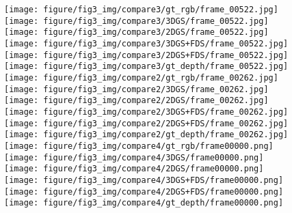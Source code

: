 \begin{figure}[t] \centering

    \texttt{[image: figure/fig3\_img/compare3/gt\_rgb/frame\_00522.jpg]}
    \texttt{[image: figure/fig3\_img/compare3/3DGS/frame\_00522.jpg]}
    \texttt{[image: figure/fig3\_img/compare3/2DGS/frame\_00522.jpg]}
    \texttt{[image: figure/fig3\_img/compare3/3DGS+FDS/frame\_00522.jpg]}
    \texttt{[image: figure/fig3\_img/compare3/2DGS+FDS/frame\_00522.jpg]}
    \texttt{[image: figure/fig3\_img/compare3/gt\_depth/frame\_00522.jpg]} \\


     \texttt{[image: figure/fig3\_img/compare2/gt\_rgb/frame\_00262.jpg]}
    \texttt{[image: figure/fig3\_img/compare2/3DGS/frame\_00262.jpg]}
    \texttt{[image: figure/fig3\_img/compare2/2DGS/frame\_00262.jpg]}
    \texttt{[image: figure/fig3\_img/compare2/3DGS+FDS/frame\_00262.jpg]}
    \texttt{[image: figure/fig3\_img/compare2/2DGS+FDS/frame\_00262.jpg]}
    \texttt{[image: figure/fig3\_img/compare2/gt\_depth/frame\_00262.jpg]} \\

    \texttt{[image: figure/fig3\_img/compare4/gt\_rgb/frame00000.png]}
    \texttt{[image: figure/fig3\_img/compare4/3DGS/frame00000.png]}
    \texttt{[image: figure/fig3\_img/compare4/2DGS/frame00000.png]}
    \texttt{[image: figure/fig3\_img/compare4/3DGS+FDS/frame00000.png]}
    \texttt{[image: figure/fig3\_img/compare4/2DGS+FDS/frame00000.png]}
    \texttt{[image: figure/fig3\_img/compare4/gt\_depth/frame00000.png]} \\


\end{figure}
